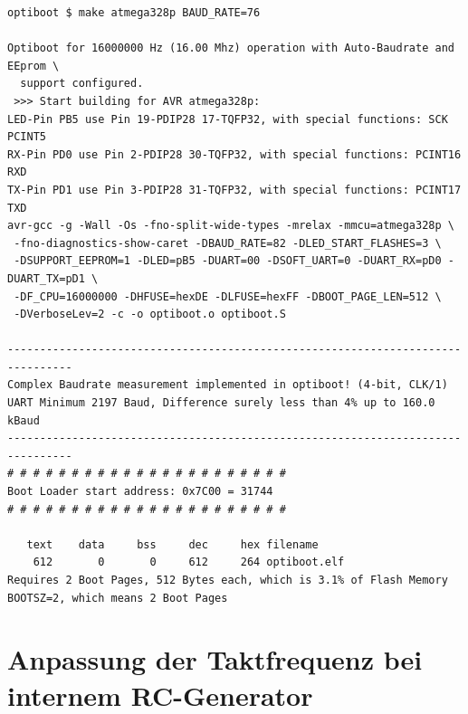 \begin{verbatim}
optiboot $ make atmega328p BAUD_RATE=76

Optiboot for 16000000 Hz (16.00 Mhz) operation with Auto-Baudrate and EEprom \
  support configured.
 >>> Start building for AVR atmega328p:
LED-Pin PB5 use Pin 19-PDIP28 17-TQFP32, with special functions: SCK PCINT5
RX-Pin PD0 use Pin 2-PDIP28 30-TQFP32, with special functions: PCINT16 RXD
TX-Pin PD1 use Pin 3-PDIP28 31-TQFP32, with special functions: PCINT17 TXD
avr-gcc -g -Wall -Os -fno-split-wide-types -mrelax -mmcu=atmega328p \
 -fno-diagnostics-show-caret -DBAUD_RATE=82 -DLED_START_FLASHES=3 \
 -DSUPPORT_EEPROM=1 -DLED=pB5 -DUART=00 -DSOFT_UART=0 -DUART_RX=pD0 -DUART_TX=pD1 \
 -DF_CPU=16000000 -DHFUSE=hexDE -DLFUSE=hexFF -DBOOT_PAGE_LEN=512 \
 -DVerboseLev=2 -c -o optiboot.o optiboot.S

--------------------------------------------------------------------------------
Complex Baudrate measurement implemented in optiboot! (4-bit, CLK/1)
UART Minimum 2197 Baud, Difference surely less than 4% up to 160.0 kBaud
--------------------------------------------------------------------------------
# # # # # # # # # # # # # # # # # # # # # #
Boot Loader start address: 0x7C00 = 31744
# # # # # # # # # # # # # # # # # # # # # #

   text	   data	    bss	    dec	    hex	filename
    612	      0	      0	    612	    264	optiboot.elf
Requires 2 Boot Pages, 512 Bytes each, which is 3.1% of Flash Memory
BOOTSZ=2, which means 2 Boot Pages

\end{verbatim}


\section{Anpassung der Taktfrequenz bei internem RC-Generator}

